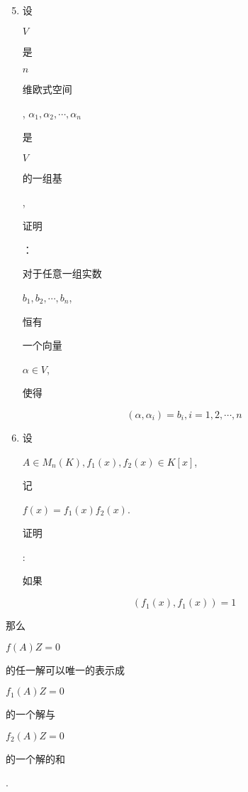\documentclass[10pt]{article}
\begin{document}
\begin{enumerate}
  \setcounter{enumi}{4}
  \item \begin{CJK}{UTF8}{mj}设\end{CJK} $V$ \begin{CJK}{UTF8}{mj}是\end{CJK} $n$ \begin{CJK}{UTF8}{mj}维欧式空间\end{CJK}, $\alpha_{1}, \alpha_{2}, \cdots, \alpha_{n}$ \begin{CJK}{UTF8}{mj}是\end{CJK} $V$ \begin{CJK}{UTF8}{mj}的一组基\end{CJK}, \begin{CJK}{UTF8}{mj}证明\end{CJK}：\begin{CJK}{UTF8}{mj}对于任意一组实数\end{CJK} $b_{1}, b_{2}, \cdots, b_{n}$, \begin{CJK}{UTF8}{mj}恒有\end{CJK} \begin{CJK}{UTF8}{mj}一个向量\end{CJK} $\alpha \in V$, \begin{CJK}{UTF8}{mj}使得\end{CJK}
\end{enumerate}
$$
\left(\alpha, \alpha_{i}\right)=b_{i}, i=1,2, \cdots, n
$$

\begin{enumerate}
  \setcounter{enumi}{5}
  \item \begin{CJK}{UTF8}{mj}设\end{CJK} $A \in M_{n}(K), f_{1}(x), f_{2}(x) \in K[x]$, \begin{CJK}{UTF8}{mj}记\end{CJK} $f(x)=f_{1}(x) f_{2}(x)$. \begin{CJK}{UTF8}{mj}证明\end{CJK}: \begin{CJK}{UTF8}{mj}如果\end{CJK}
\end{enumerate}
$$
\left(f_{1}(x), f_{1}(x)\right)=1
$$
\begin{CJK}{UTF8}{mj}那么\end{CJK} $f(A) Z=0$ \begin{CJK}{UTF8}{mj}的任一解可以唯一的表示成\end{CJK} $f_{1}(A) Z=0$ \begin{CJK}{UTF8}{mj}的一个解与\end{CJK} $f_{2}(A) Z=0$ \begin{CJK}{UTF8}{mj}的一个解的和\end{CJK}.
\end{document}
